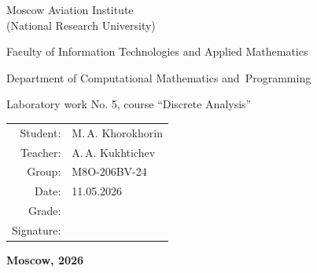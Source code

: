 \begin{titlepage}
\begin{center}
\bfseries

{\Large Moscow Aviation Institute\\ (National Research University)

}

\vspace{48pt}

{\large Faculty of Information Technologies and Applied Mathematics
}

\vspace{36pt}

{\large Department of Computational Mathematics and~Programming

}

\vspace{48pt}

Laboratory work No. 5, course \enquote{Discrete Analysis}

\end{center}

\vspace{72pt}

\begin{flushright}
\begin{tabular}{rl}
Student: & M.\,A. Khorokhorin \\
Teacher: & A.\,A. Kukhtichev \\
Group: & M8O-206BV-24 \\
Date: & 11.05.2026 \\
Grade: & \\
Signature: & \\
\end{tabular}
\end{flushright}

\vfill

\begin{center}
\bfseries
Moscow, 2026
\end{center}
\end{titlepage}

\pagebreak
